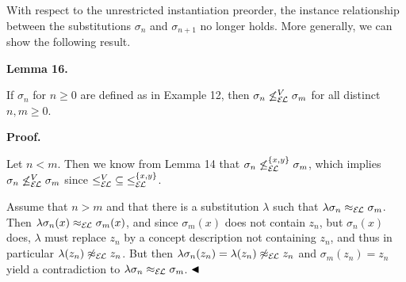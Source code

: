\documentclass[10pt,a4paper]{amsart}
\begin{document}
 
With respect to the unrestricted instantiation preorder, the instance relationship between the substitutions $\sigma_{n}$ and $\sigma_{n+1}$ no longer holds. More generally, we can show the following result.\par
 
 
 
\par\medskip\noindent\textbf{Lemma 16.}\par
 
 
If $\sigma_{n}$ for $n\geq 0$ are defined as in Example 12, then $\sigma_{n}\not\leq_{\mathcal{E\mkern-1.618muL}}^{V}\sigma_{m}$ for all distinct $n,m\geq 0$.\par
 
 
 
 
 
\par\medskip\noindent\textbf{Proof.}\par
 
 
Let $n<m$. Then we know from Lemma 14 that $\sigma_{n}\not\leq_{\mathcal{E\mkern-1.618muL}}^{\{x,y\}}\sigma_{m}$, which implies $\sigma_{n}\not\leq_{\mathcal{E\mkern-1.618muL}}^{V}\sigma_{m}$ since ${\leq_{\mathcal{E\mkern-1.618muL}}^{V}}\subseteq{\leq_{\mathcal{E\mkern-1.618%
muL}}^{\{x,y\}}}$.\par
 
 
 
Assume that $n>m$ and that there is a substitution $\lambda$ such that $\lambda\sigma_{n}\approx_{\mathcal{E\mkern-1.618muL}}\sigma_{m}$. Then $\lambda\sigma_{n}(x)\approx_{\mathcal{E\mkern-1.618muL}}\sigma_{m}(x)$, and since $\sigma_{m}(x)$ does not contain $z_{n}$, but $\sigma_{n}(x)$ does, $\lambda$ must replace $z_{n}$ by a concept description not containing $z_{n}$, and thus in particular $\lambda(z_{n})\not\approx_{\mathcal{E\mkern-1.618muL}}z_{n}$. But then $\lambda\sigma_{n}(z_{n})=\lambda(z_{n})\not\approx_{\mathcal{E\mkern-1.618muL}%
}z_{n}$ and $\sigma_{m}(z_{n})=z_{n}$ yield a contradiction to $\lambda\sigma_{n}\approx_{\mathcal{E\mkern-1.618muL}}\sigma_{m}$. $\hfill\blacktriangleleft$\par
 
\end{document}
